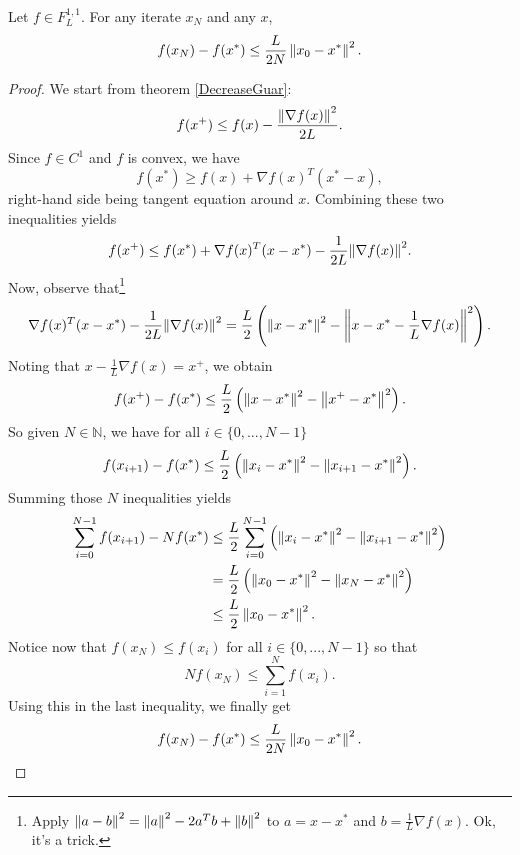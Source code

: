 \begin{theorem}
Let $f \in F_L^{1,1}$. For any iterate $x_N$ and any $x$,
\begin{equation*}
f(x_N) - f(x^*) \le \frac{L}{2N} \left\Vert x_0-x^* \right\Vert^2 .
\end{equation*}
\end{theorem}
\begin{proof}
We start from theorem \ref{DecreaseGuar}:
\begin{equation*}
f(x^+) \le f(x) - \frac{{\left\Vert \nabla f(x) \right\Vert}^2}{2L} .
\end{equation*}
Since $f \in C^1$ and $f$ is convex, we have
\begin{equation*}
f(x^*) \ge f(x) + \nabla f(x)^T(x^*-x),
\end{equation*}
right-hand side being tangent equation around $x$. Combining these two inequalities yields
\begin{equation*}
f(x^+) \le f(x^*) + \nabla f(x)^T(x-x^*) - \frac{1}{2L} {\left\Vert \nabla f(x) \right\Vert}^2 .
\end{equation*}
Now, observe that\footnote{Apply $\left\Vert a-b \right\Vert^2 = \left\Vert a \right\Vert^2 - 2a^Tb + \left\Vert b \right\Vert^2$ to $a = x-x^*$ and $b = \frac{1}{L}\nabla f(x)$. Ok, it's a trick.}
\begin{equation*}
\nabla f(x)^T(x-x^*) - \frac{1}{2L}{\left\Vert \nabla f(x) \right\Vert}^2 = \frac{L}{2} \left( \left\Vert x-x^* \right\Vert^2 - \left\Vert x-x^*-\frac{1}{L}\nabla f(x) \right\Vert^2 \right) .
\end{equation*}
Noting that $x-\frac{1}{L}\nabla f(x) = x^+$, we obtain
\begin{equation*}
f(x^+) - f(x^*) \le \frac{L}{2} \left( \left\Vert x-x^* \right\Vert^2 - \left\Vert x^+-x^* \right\Vert^2 \right) .
\end{equation*}
So given $N \in \mathbb{N}$, we have for all $i \in \{0,...,N-1\}$
\begin{equation*}
f(x_{i+1}) - f(x^*) \le \frac{L}{2} \left( \left\Vert x_i-x^* \right\Vert^2 - \left\Vert x_{i+1}-x^* \right\Vert^2 \right) .
\end{equation*}
Summing those $N$ inequalities yields
\begin{align*}
\sum_{i=0}^{N-1}f(x_{i+1}) - N f(x^*) &\le \frac{L}{2} \sum_{i=0}^{N-1}\left( \left\Vert x_i-x^* \right\Vert^2 - \left\Vert x_{i+1}-x^* \right\Vert^2 \right) \\
&= \frac{L}{2} \left( \left\Vert x_0-x^* \right\Vert^2 - \left\Vert x_N-x^* \right\Vert^2 \right) \\
&\le \frac{L}{2} \left\Vert x_0-x^* \right\Vert^2 .
\end{align*}
Notice now that $f(x_N) \le f(x_i)$ for all $i \in \{0,...,N-1\}$ so that
\begin{equation*}
 N f(x_N) \le \sum_{i=1}^Nf(x_i) .
\end{equation*}
Using this in the last inequality, we finally get
\begin{equation*}
f(x_{N}) - f(x^*) \le  \frac{L}{2N} \left\Vert x_0-x^* \right\Vert^2 . \qedhere
\end{equation*}
\end{proof}

